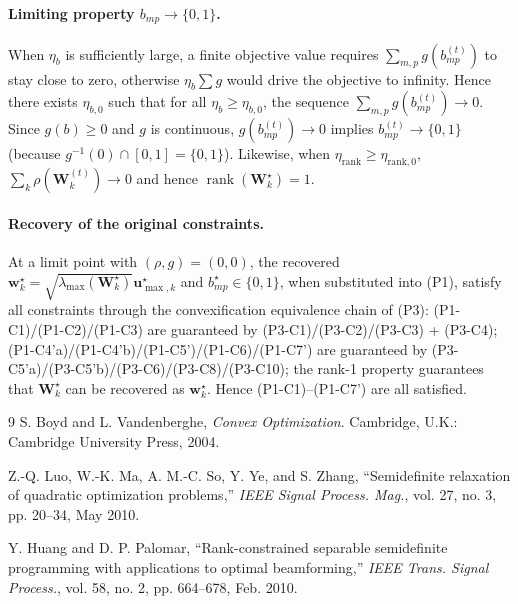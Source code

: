 \documentclass[12pt,a4paper]{article}
\newcommand{\vect}[1]{\mathbf{#1}}
\newcommand{\mat}[1]{\mathbf{#1}}
\DeclareMathOperator{\rank}{rank}
\begin{document}
\paragraph{Limiting property $b_{mp} \to \{0,1\}$.} When $\eta_b$ is sufficiently large, a finite objective value requires $\sum_{m,p} g(b_{mp}^{(t)})$ to stay close to zero, otherwise $\eta_b \sum g$ would drive the objective to infinity. Hence there exists $\eta_{b,0}$ such that for all $\eta_b \geq \eta_{b,0}$, the sequence $\sum_{m,p} g(b_{mp}^{(t)}) \to 0$. Since $g(b) \geq 0$ and $g$ is continuous, $g(b_{mp}^{(t)}) \to 0$ implies $b_{mp}^{(t)} \to \{0,1\}$ (because $g^{-1}(0) \cap [0,1] = \{0, 1\}$). Likewise, when $\eta_{\text{rank}} \geq \eta_{\text{rank},0}$, $\sum_k \rho(\mat{W}_k^{(t)}) \to 0$ and hence $\rank(\mat{W}_k^\star) = 1$.

\paragraph{Recovery of the original constraints.} At a limit point with $(\rho, g) = (0, 0)$, the recovered $\vect{w}_k^\star = \sqrt{\lambda_{\max}(\mat{W}_k^\star)} \vect{u}_{\max,k}^\star$ and $b_{mp}^\star \in \{0,1\}$, when substituted into (P1), satisfy all constraints through the convexification equivalence chain of (P3): (P1-C1)/(P1-C2)/(P1-C3) are guaranteed by (P3-C1)/(P3-C2)/(P3-C3) + (P3-C4); (P1-C4'a)/(P1-C4'b)/(P1-C5')/(P1-C6)/(P1-C7') are guaranteed by (P3-C5'a)/(P3-C5'b)/(P3-C6)/(P3-C8)/(P3-C10); the rank-1 property guarantees that $\mat{W}_k^\star$ can be recovered as $\vect{w}_k^\star$. Hence (P1-C1)--(P1-C7') are all satisfied.

\begin{thebibliography}{9}
S. Boyd and L. Vandenberghe, \emph{Convex Optimization}. Cambridge, U.K.: Cambridge University Press, 2004.

Z.-Q. Luo, W.-K. Ma, A. M.-C. So, Y. Ye, and S. Zhang, ``Semidefinite relaxation of quadratic optimization problems,'' \emph{IEEE Signal Process. Mag.}, vol. 27, no. 3, pp. 20--34, May 2010.

Y. Huang and D. P. Palomar, ``Rank-constrained separable semidefinite programming with applications to optimal beamforming,'' \emph{IEEE Trans. Signal Process.}, vol. 58, no. 2, pp. 664--678, Feb. 2010.
\end{thebibliography}
\end{document}
